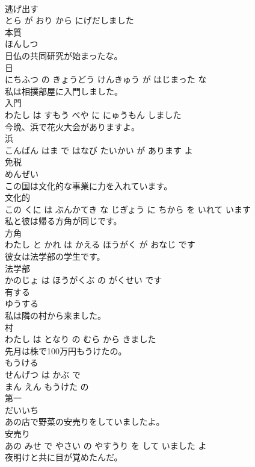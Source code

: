 \documentclass[8pt]{extreport}
\begin{document}
\begin{CJK}{UTF8}{min}
\\	逃げ出す 
\\	とら が おり から にげだしました			
\\	本質	
\\	ほんしつ		
\\	日仏の共同研究が始まったな。	
\\	日 
\\	にちふつ の きょうどう けんきゅう が はじまった な			
\\	私は相撲部屋に入門しました。	
\\	入門 
\\	わたし は すもう べや に にゅうもん しました			
\\	今晩、浜で花火大会がありますよ。	
\\	浜 
\\	こんばん はま で はなび たいかい が あります よ			
\\	免税	
\\	めんぜい		
\\	この国は文化的な事業に力を入れています。	
\\	文化的 
\\	この くに は ぶんかてき な じぎょう に ちから を いれて います			
\\	私と彼は帰る方角が同じです。	
\\	方角 
\\	わたし と かれ は かえる ほうがく が おなじ です			
\\	彼女は法学部の学生です。	
\\	法学部 
\\	かのじょ は ほうがくぶ の がくせい です			
\\	有する	
\\	ゆうする		
\\	私は隣の村から来ました。	
\\	村 
\\	わたし は となり の むら から きました			
\\	先月は株で100万円もうけたの。	
\\	もうける 
\\	せんげつ は かぶ で 
\\	まん えん もうけた の			
\\	第一	
\\	だいいち		
\\	あの店で野菜の安売りをしていましたよ。	
\\	安売り 
\\	あの みせ で やさい の やすうり を して いました よ			
\\	夜明けと共に目が覚めたんだ。	

\end{CJK}
\end{document}
